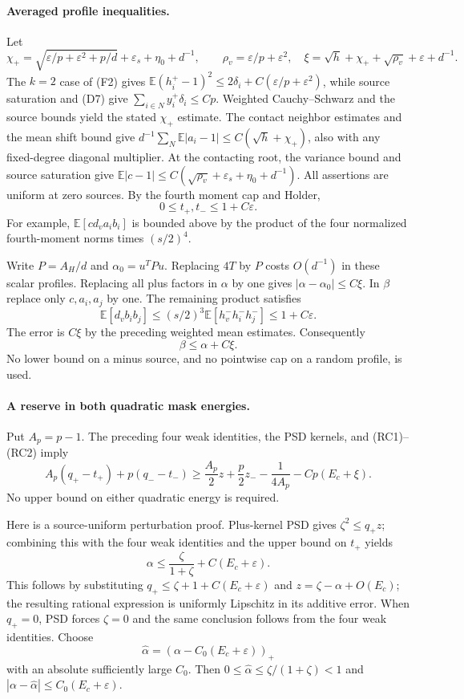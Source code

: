 \documentclass[10pt]{article}
\numberwithin{equation}{section}
\newcommand{\1}{\mathbf1}
\begin{document}
\paragraph{Averaged profile inequalities.}
Let
\[
 \chi_+=\sqrt{\varepsilon/p+\varepsilon^2+p/d}
             +\varepsilon_s+\eta_0+d^{-1},\qquad
 \rho_v=\varepsilon/p+\varepsilon^2,
 \quad \xi=\sqrt h+\chi_++\sqrt{\rho_v}+\varepsilon+d^{-1}.
\]
The $k=2$ case of (F2) gives
$\mathbb E(h_i^+-1)^2\le2\delta_i+C(\varepsilon/p+\varepsilon^2)$,
while source saturation and (D7) give
$\sum_{i\in N}y_i^+\delta_i\le Cp$.
Weighted Cauchy--Schwarz and the source bounds yield the stated
$\chi_+$ estimate. The contact neighbor estimates and the mean shift bound give
$d^{-1}\sum_N\mathbb E|a_i-1|\le C(\sqrt h+\chi_+)$,
also with any fixed-degree diagonal multiplier. At the contacting
root, the variance bound and source saturation give
$\mathbb E|c-1|\le C(\sqrt{\rho_v}+\varepsilon_s+\eta_0+d^{-1})$.
All assertions are uniform at zero sources.
By the fourth moment cap and Holder,
\[
 0\le t_+,t_-\le1+C\varepsilon.
 \tag{RC1}
\]
For example, $\mathbb E[cd_va_ib_i]$ is bounded above by the product
of the four normalized fourth-moment norms times $(s/2)^4$.

Write $P=A_H/d$ and $\alpha_0=u^TPu$. Replacing $4T$ by $P$ costs
$O(d^{-1})$ in these scalar profiles. Replacing all plus factors in
$\alpha$ by one gives $|\alpha-\alpha_0|\le C\xi$.
In $\beta$ replace only $c,a_i,a_j$ by one. The remaining product
satisfies
\[
 \mathbb E[d_v b_i b_j]
 \le(s/2)^3\mathbb E[h_v^-h_i^-h_j^-]\le1+C\varepsilon.
\]
The error is $C\xi$ by the preceding weighted mean estimates.
Consequently
\[
 \beta\le\alpha+C\xi.                                  \tag{RC2}
\]
No lower bound on a minus source, and no pointwise cap on a random
profile, is used.

\paragraph{A reserve in both quadratic mask energies.}
Put $A_p=p-1$. The preceding four weak identities, the PSD kernels,
and (RC1)--(RC2) imply
\[
 \boxed{\quad
 A_p(q_+-t_+)+p(q_--t_-)
 \ge\frac{A_p}2 z+\frac p2 z_-
          -\frac1{4A_p}-Cp(E_c+\xi).
 \quad}                                                    \tag{JR2}
\]
No upper bound on either quadratic energy is required.

Here is a source-uniform perturbation proof. Plus-kernel PSD gives
$\zeta^2\le q_+z$; combining this with the four weak identities and the upper bound
on $t_+$ yields
\[
 \alpha\le\frac\zeta{1+\zeta}+C(E_c+\varepsilon).
\]
This follows by substituting
$q_+\le\zeta+1+C(E_c+\varepsilon)$ and
$z=\zeta-\alpha+O(E_c)$; the resulting rational expression is
uniformly Lipschitz in its additive error. When $q_+=0$, PSD
forces $\zeta=0$ and the same conclusion follows from the four weak identities.
Choose
\[
 \widehat\alpha=(\alpha-C_0(E_c+\varepsilon))_+
\]
with an absolute sufficiently large $C_0$. Then
$0\le\widehat\alpha\le\zeta/(1+\zeta)<1$ and
$|\alpha-\widehat\alpha|\le C_0(E_c+\varepsilon)$.
\end{document}
